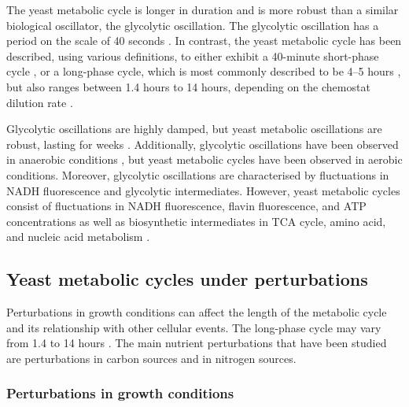 The yeast metabolic cycle is longer in duration and is more robust than a similar biological oscillator, the glycolytic oscillation.
The glycolytic oscillation has a period on the scale of 40 seconds \parencite{olsenRegulationGlycolyticOscillations2009}.
In contrast, the yeast metabolic cycle has been described, using various definitions, to either exhibit a 40-minute short-phase cycle \parencite{lloydUltradianMetronomeTimekeeper2005, liRapidGenomescaleResponse2006, lloydRedoxRhythmicityClocks2007}, or a long-phase cycle, which is most commonly described to be 4--5 hours \parencite{tuLogicYeastMetabolic2005, tuCyclicChangesMetabolic2007}, but also ranges between 1.4 hours to 14 hours, depending on the chemostat dilution rate \parencite{beuseEffectDilutionRate1998}.

Glycolytic oscillations are highly damped, but yeast metabolic oscillations are robust, lasting for weeks \parencite{lloydRedoxRhythmicityClocks2007}.
Additionally, glycolytic oscillations have been observed in anaerobic conditions \parencite{lloydSaccharomycesCerevisiaeOscillatory2019}, but yeast metabolic cycles have been observed in aerobic conditions.
Moreover, glycolytic oscillations are characterised by fluctuations in NADH fluorescence and glycolytic intermediates.
However, yeast metabolic cycles consist of fluctuations in NADH fluorescence, flavin fluorescence, and ATP concentrations as well as biosynthetic intermediates in TCA cycle, amino acid, and nucleic acid metabolism \parencite{tuCyclicChangesMetabolic2007}.


\subsection{Yeast metabolic cycles under perturbations}
\label{subsec:intro-ymc-perturbations}

Perturbations in growth conditions can affect the length of the metabolic cycle and its relationship with other cellular events.
The long-phase cycle may vary from 1.4 to 14 hours \parencite{caustonMetabolicRhythmsFramework2018}.
The main nutrient perturbations that have been studied are perturbations in carbon sources and in nitrogen sources.

\subsubsection{Perturbations in growth conditions}
\label{subsubsec:intro-ymc-perturbations-nutrient}


